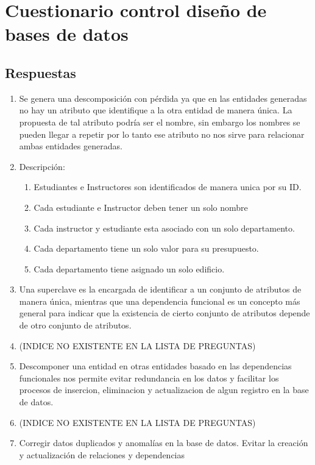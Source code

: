 \documentclass[twoside]{article}
\begin{document}
\selectfont
\newpage
\section*{\centering Cuestionario control diseño de bases de datos}
\subsection*{Respuestas}
\begin{enumerate}
      \item Se genera una descomposición con pérdida ya que en las entidades generadas no hay un atributo que
            identifique a la otra entidad de manera única. La propuesta de tal atributo podría ser el nombre, sin embargo
            los nombres se pueden llegar a repetir por lo tanto ese atributo no nos sirve para relacionar ambas entidades generadas.
      \item Descripci\'on:
            \begin{enumerate}
                  \item Estudiantes e Instructores son identificados de manera unica por su ID.
                  \item Cada estudiante e Instructor deben tener un solo nombre
                  \item Cada instructor y estudiante esta asociado con un solo departamento.
                  \item Cada departamento tiene un solo valor para su presupuesto.
                  \item Cada departamento tiene asignado un solo edificio.
            \end{enumerate}
      \item Una superclave es la encargada de identificar a un conjunto de atributos de manera única, mientras
            que una dependencia funcional es un concepto más general para indicar que la existencia de cierto conjunto
            de atributos depende de otro conjunto de atributos.
      \item (INDICE NO EXISTENTE EN LA LISTA DE PREGUNTAS)
      \item Descomponer una entidad en otras entidades basado en las dependencias funcionales nos permite evitar redundancia
            en los datos y facilitar los procesos de insercion, eliminacion y actualizacion de algun registro en la base de datos.
      \item (INDICE NO EXISTENTE EN LA LISTA DE PREGUNTAS)
      \item Corregir datos duplicados y anomalías en la base de datos. Evitar la creación y actualización de relaciones y dependencias

\end{enumerate}
\end{document}
